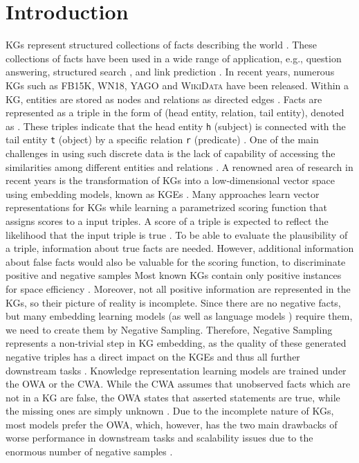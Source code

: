 \chapter{Introduction}
\label{ch:introduction}

\acp{KG} represent structured collections of facts describing the world   \cite{hogan2020knowledge}.
These collections of facts have been used in a wide range of application, e.g., question answering, structured search \cite{zhang2019nscaching}, and link prediction \cite{cai2017kbgan, Alam2020AffinityDN}.
In recent years, numerous \acp{KG} such as \textsc{FB15K}, \textsc{WN18}, \textsc{YAGO} \cite{ConEx} and \textsc{WikiData} \cite{arnaoutwikinegata} have been released.
Within a \ac{KG}, entities are stored as nodes and relations as directed edges \cite{zhang2019nscaching}.
Facts are represented as a triple in the form of (head entity, relation, tail entity), denoted as .
These triples indicate that the head entity \texttt{h} (subject) is connected with the tail entity \texttt{t} (object) by a specific relation \texttt{r} (predicate) \cite{zhang2019nscaching, Alam2020AffinityDN}.
One of the main challenges in using such discrete data is the lack of capability of accessing the similarities among different entities and relations \cite{cai2017kbgan}. 
A renowned area of research in recent years is the transformation of \acp{KG} into a low-dimensional vector space using embedding models, known as \acp{KGE} \cite{Alam2020AffinityDN}.
Many approaches learn vector representations for \acp{KG} while learning a parametrized scoring function that assigns scores to a input triples.
A score of a triple is expected to reflect the likelihood that the input triple is true \cite{ConvE, qiannegative}.
To be able to evaluate the plausibility of a triple, information about true facts are needed.
However, additional information about false facts would also be valuable for the scoring function, to discriminate positive and negative samples \cite{qiannegative}
Most known \acp{KG} contain only positive instances
for space efficiency \cite{qiannegative}.
Moreover, not all positive information are represented in the \acp{KG}, so their picture of reality is incomplete.
Since there are no negative facts, but many embedding learning models (as well as language models \cite{MikolovSCCD13}) require them, we need to create them by Negative Sampling.
Therefore, Negative Sampling represents a non-trivial step in \ac{KG} embedding, as the quality of these generated negative triples has a direct impact on the \acp{KGE} and thus all further downstream tasks \cite{qiannegative}.
Knowledge representation learning models are trained under the \ac{OWA} or the \ac{CWA}.
While the \ac{CWA} assumes that unobserved facts which are not in a \ac{KG} are false, the \ac{OWA}  states that asserted statements are true, while the missing ones are simply unknown \cite{arnaout2020enriching, qiannegative}.
Due to the incomplete nature of KGs, most models prefer the \ac{OWA}, which, however, has the two main drawbacks of 
worse performance in downstream tasks and scalability issues due to the enormous number of negative samples \cite{qiannegative}.

